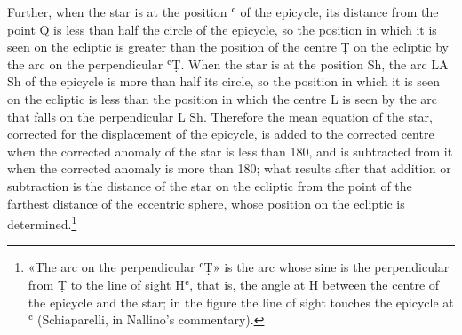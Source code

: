 \documentclass[11pt]{article}
\newcommand{\ArPage}[1]{\marginpar{\footnotesize\color{gray}Ar.\,p.\,#1}}
\begin{document}
\par \ArPage{98}Further, when the star is at the position ʿ of the epicycle, its distance from the point Q is less than half the circle of the epicycle, so the position in which it is seen on the ecliptic is greater than the position of the centre Ṭ on the ecliptic by the arc on the perpendicular ʿṬ. When the star is at the position Sh, the arc LA Sh of the epicycle is more than half its circle, so the position in which it is seen on the ecliptic is less than the position in which the centre L is seen by the arc that falls on the perpendicular L Sh. Therefore the mean equation of the star, corrected for the displacement of the epicycle, is added to the corrected centre when the corrected anomaly of the star is less than 180, and is subtracted from it when the corrected anomaly is more than 180; what results after that addition or subtraction is the distance of the star on the ecliptic from the point of the farthest distance of the eccentric sphere, whose position on the ecliptic is determined.\footnote{«The arc on the perpendicular ʿṬ» is the arc whose sine is the perpendicular from Ṭ to the line of sight Hʿ, that is, the angle at H between the centre of the epicycle and the star; in the figure the line of sight touches the epicycle at ʿ (Schiaparelli, in Nallino's commentary).}\par
\end{document}
